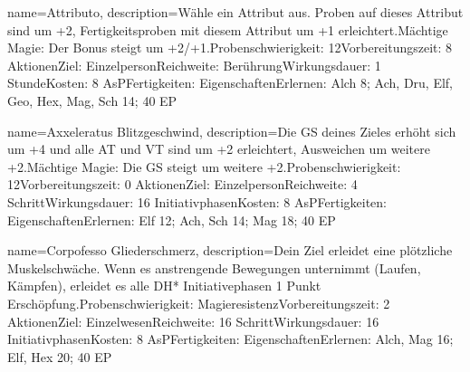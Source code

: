 {
    name={Attributo},
    description={Wähle ein Attribut aus. Proben auf dieses Attribut sind um +2, Fertigkeitsproben mit diesem Attribut um +1 erleichtert.\newline Mächtige Magie: Der Bonus steigt um +2/+1.\newline Probenschwierigkeit: 12\newline Vorbereitungszeit: 8 Aktionen\newline Ziel: Einzelperson\newline Reichweite: Berührung\newline Wirkungsdauer: 1 Stunde\newline Kosten: 8 AsP\newline Fertigkeiten: Eigenschaften\newline Erlernen: Alch 8; Ach, Dru, Elf, Geo, Hex, Mag, Sch 14; 40 EP}
}


{
    name={Axxeleratus Blitzgeschwind},
    description={Die GS deines Zieles erhöht sich um +4 und alle AT und VT sind um +2 erleichtert, Ausweichen um weitere +2.\newline Mächtige Magie: Die GS steigt um weitere +2.\newline Probenschwierigkeit: 12\newline Vorbereitungszeit: 0 Aktionen\newline Ziel: Einzelperson\newline Reichweite: 4 Schritt\newline Wirkungsdauer: 16 Initiativphasen\newline Kosten: 8 AsP\newline Fertigkeiten: Eigenschaften\newline Erlernen: Elf 12; Ach, Sch 14; Mag 18; 40 EP}
}


{
    name={Corpofesso Gliederschmerz},
    description={Dein Ziel erleidet eine plötzliche Muskelschwäche. Wenn es anstrengende Bewegungen unternimmt (Laufen, Kämpfen), erleidet es alle DH* Initiativephasen 1 Punkt Erschöpfung.\newline Probenschwierigkeit: Magieresistenz\newline Vorbereitungszeit: 2 Aktionen\newline Ziel: Einzelwesen\newline Reichweite: 16 Schritt\newline Wirkungsdauer: 16 Initiativphasen\newline Kosten: 8 AsP\newline Fertigkeiten: Eigenschaften\newline Erlernen: Alch, Mag 16; Elf, Hex 20; 40 EP}
}


